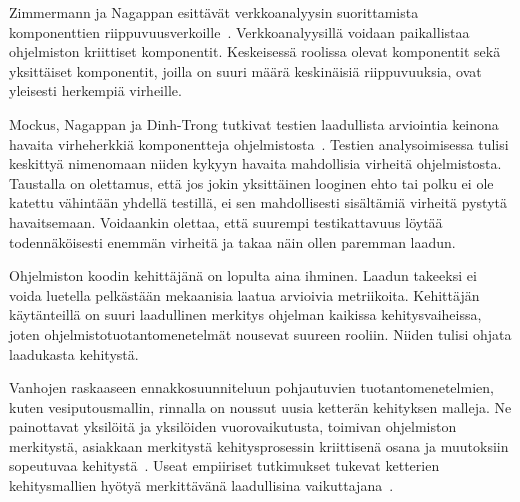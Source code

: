 \documentclass[finnish]{../tktltiki2}
\theoremstyle{definition}
\theoremstyle{remark}
\begin{document}
    Zimmermann ja Nagappan esittävät verkkoanalyysin suorittamista komponenttien riippuvuusverkoille~\cite{ZN08}. 
Verkkoanalyysillä voidaan paikallistaa ohjelmiston kriittiset komponentit. Keskeisessä roolissa olevat komponentit sekä 
yksittäiset komponentit, joilla on suuri määrä keskinäisiä riippuvuuksia, ovat yleisesti herkempiä virheille.

    Mockus, Nagappan ja Dinh-Trong tutkivat testien laadullista arviointia keinona havaita virheherkkiä komponentteja 
ohjelmistosta~\cite{MNDT09}. Testien analysoimisessa tulisi keskittyä nimenomaan niiden kykyyn havaita mahdollisia 
virheitä ohjelmistosta. Taustalla on olettamus, että jos jokin yksittäinen looginen ehto tai polku ei ole katettu 
vähintään yhdellä testillä, ei sen mahdollisesti sisältämiä virheitä pystytä havaitsemaan. Voidaankin olettaa, että 
suurempi testikattavuus löytää todennäköisesti enemmän virheitä ja takaa näin ollen paremman laadun.

    Ohjelmiston koodin kehittäjänä on lopulta aina ihminen.  Laadun takeeksi ei voida luetella pelkästään mekaanisia 
laatua arvioivia metriikoita. Kehittäjän käytänteillä on suuri laadullinen merkitys ohjelman kaikissa kehitysvaiheissa, 
joten ohjelmistotuotantomenetelmät nousevat suureen rooliin. Niiden tulisi ohjata laadukasta kehitystä.

    Vanhojen raskaaseen ennakkosuunniteluun pohjautuvien tuotantomenetelmien, kuten vesiputousmallin, rinnalla on 
noussut uusia ketterän kehityksen malleja. Ne painottavat yksilöitä ja yksilöiden vuorovaikutusta, toimivan ohjelmiston 
merkitystä, asiakkaan merkitystä kehitysprosessin kriittisenä osana ja muutoksiin sopeutuvaa kehitystä~\cite{BBB01}. 
Useat empiiriset tutkimukset tukevat ketterien kehitysmallien hyötyä merkittävänä laadullisina vaikuttajana~\cite{SS10}. 

\newpage




\end{document}
